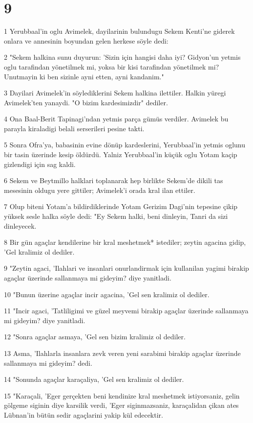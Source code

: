 \chapter{9}

\par 1 Yerubbaal'in oglu Avimelek, dayilarinin bulundugu Sekem Kenti'ne giderek onlara ve annesinin boyundan gelen herkese söyle dedi:
\par 2 "Sekem halkina sunu duyurun: 'Sizin için hangisi daha iyi? Gidyon'un yetmis oglu tarafindan yönetilmek mi, yoksa bir kisi tarafindan yönetilmek mi? Unutmayin ki ben sizinle ayni etten, ayni kandanim."
\par 3 Dayilari Avimelek'in söylediklerini Sekem halkina ilettiler. Halkin yüregi Avimelek'ten yanaydi. "O bizim kardesimizdir" dediler.
\par 4 Ona Baal-Berit Tapinagi'ndan yetmis parça gümüs verdiler. Avimelek bu parayla kiraladigi belali serserileri pesine takti.
\par 5 Sonra Ofra'ya, babasinin evine dönüp kardeslerini, Yerubbaal'in yetmis oglunu bir tasin üzerinde kesip öldürdü. Yalniz Yerubbaal'in küçük oglu Yotam kaçip gizlendigi için sag kaldi.
\par 6 Sekem ve Beytmillo halklari toplanarak hep birlikte Sekem'de dikili tas mesesinin oldugu yere gittiler; Avimelek'i orada kral ilan ettiler.
\par 7 Olup biteni Yotam'a bildirdiklerinde Yotam Gerizim Dagi'nin tepesine çikip yüksek sesle halka söyle dedi: "Ey Sekem halki, beni dinleyin, Tanri da sizi dinleyecek.
\par 8 Bir gün agaçlar kendilerine bir kral meshetmek* istediler; zeytin agacina gidip, 'Gel kralimiz ol dediler.
\par 9 "Zeytin agaci, 'Ilahlari ve insanlari onurlandirmak için kullanilan yagimi birakip agaçlar üzerinde sallanmaya mi gideyim? diye yanitladi.
\par 10 "Bunun üzerine agaçlar incir agacina, 'Gel sen kralimiz ol dediler.
\par 11 "Incir agaci, 'Tatliligimi ve güzel meyvemi birakip agaçlar üzerinde sallanmaya mi gideyim? diye yanitladi.
\par 12 "Sonra agaçlar asmaya, 'Gel sen bizim kralimiz ol dediler.
\par 13 Asma, 'Ilahlarla insanlara zevk veren yeni sarabimi birakip agaçlar üzerinde sallanmaya mi gideyim? dedi.
\par 14 "Sonunda agaçlar karaçaliya, 'Gel sen kralimiz ol dediler.
\par 15 "Karaçali, 'Eger gerçekten beni kendinize kral meshetmek istiyorsaniz, gelin gölgeme siginin diye karsilik verdi, 'Eger siginmazsaniz, karaçalidan çikan ates Lübnan'in bütün sedir agaçlarini yakip kül edecektir.
